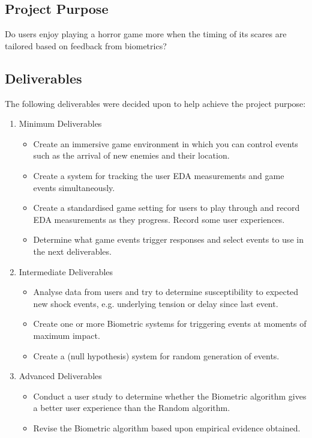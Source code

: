 \documentclass[12pt,a4paper]{article}
\begin{document}
\subsection{Project Purpose}
Do users enjoy playing a horror game more when the timing of its scares are tailored based on feedback from biometrics?

\subsection{Deliverables}
The following deliverables were decided upon to help achieve the project purpose:
\begin{enumerate}
	\item Minimum Deliverables
	\begin{itemize}
		\item Create an immersive game environment in which you can control events such as the arrival of new enemies and their location.
		\item Create a system for tracking the user EDA measurements and game events simultaneously.
		\item Create a standardised game setting for users to play through and record EDA measurements as they progress. Record some user experiences.
		\item Determine what game events trigger responses and select events to use in the next deliverables.
	\end{itemize}
	
	\item Intermediate Deliverables
	\begin{itemize}
		\item Analyse data from users and try to determine susceptibility to expected new shock events, e.g. underlying tension or delay since last event.
		\item Create one or more Biometric systems for triggering events at moments of maximum impact.
		\item Create a (null hypothesis) system for random generation of events.
	\end{itemize}
	
	\item Advanced Deliverables
	\begin{itemize}
		\item Conduct a user study to determine whether the Biometric algorithm gives a better user experience than the Random algorithm.
		\item Revise the Biometric algorithm based upon empirical evidence obtained.
	\end{itemize}
\end{enumerate}
\end{document}
